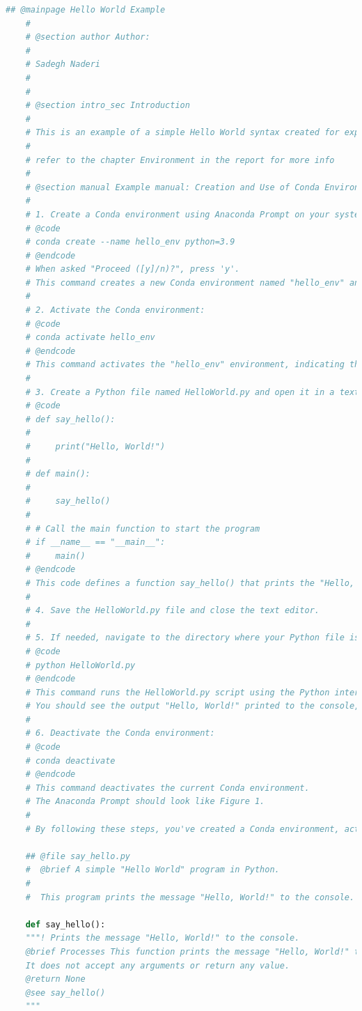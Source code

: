 \begin{lstlisting}[language=Python]
	## @mainpage Hello World Example
	#
	# @section author Author:
	#
	# Sadegh Naderi
	#
	#
	# @section intro_sec Introduction
	#
	# This is an example of a simple Hello World syntax created for explaining how to create a simple virtual environment.
	#
	# refer to the chapter Environment in the report for more info
	#
	# @section manual Example manual: Creation and Use of Conda Environments
	#
	# 1. Create a Conda environment using Anaconda Prompt on your system:
	# @code
	# conda create --name hello_env python=3.9
	# @endcode
	# When asked "Proceed ([y]/n)?", press 'y'.
	# This command creates a new Conda environment named "hello_env" and specifies Python version 3.9.
	#
	# 2. Activate the Conda environment:
	# @code
	# conda activate hello_env
	# @endcode
	# This command activates the "hello_env" environment, indicating that we want to use this environment for our Python code.
	#
	# 3. Create a Python file named HelloWorld.py and open it in a text editor. Add the following code:
	# @code
	# def say_hello():
	#
	#     print("Hello, World!")
	#
	# def main():
	#
	#     say_hello()
	#
	# # Call the main function to start the program
	# if __name__ == "__main__":
	#     main()
	# @endcode
	# This code defines a function say_hello() that prints the "Hello, World!" message to the console.
	#
	# 4. Save the HelloWorld.py file and close the text editor.
	#
	# 5. If needed, navigate to the directory where your Python file is located using the cd command. Execute the Python code:
	# @code
	# python HelloWorld.py
	# @endcode
	# This command runs the HelloWorld.py script using the Python interpreter in the activated Conda environment.
	# You should see the output "Hello, World!" printed to the console, indicating that the code executed successfully.
	#
	# 6. Deactivate the Conda environment:
	# @code
	# conda deactivate
	# @endcode
	# This command deactivates the current Conda environment.
	# The Anaconda Prompt should look like Figure 1.
	#
	# By following these steps, you've created a Conda environment, activated it, written a simple "Hello World" Python code, and executed it within the Conda environment. Conda allows you to manage different environments for different projects, providing isolation and dependency management for your Python applications.
	
	## @file say_hello.py
	#  @brief A simple "Hello World" program in Python.
	#
	#  This program prints the message "Hello, World!" to the console.
	
	def say_hello():
	"""! Prints the message "Hello, World!" to the console.
	@brief Processes This function prints the message "Hello, World!" to the console.
	It does not accept any arguments or return any value.
	@return None
	@see say_hello()
	"""
	

\end{lstlisting}
